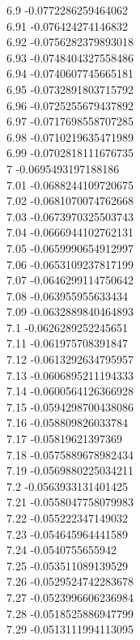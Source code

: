 {6.9	-0.0772286259464062\\
6.91	-0.076424274146832\\
6.92	-0.0756282379893018\\
6.93	-0.0748404327558486\\
6.94	-0.0740607745665181\\
6.95	-0.0732891803715792\\
6.96	-0.0725255679437892\\
6.97	-0.0717698558707285\\
6.98	-0.0710219635471989\\
6.99	-0.0702818111676735\\
7	-0.0695493197188186\\
7.01	-0.0688244109720675\\
7.02	-0.0681070074762668\\
7.03	-0.0673970325503743\\
7.04	-0.0666944102762131\\
7.05	-0.0659990654912997\\
7.06	-0.0653109237817199\\
7.07	-0.0646299114750642\\
7.08	-0.063955955633434\\
7.09	-0.0632889840464893\\
7.1	-0.0626289252245651\\
7.11	-0.061975708391847\\
7.12	-0.0613292634795957\\
7.13	-0.0606895211194333\\
7.14	-0.0600564126366928\\
7.15	-0.0594298700438086\\
7.16	-0.058809826033784\\
7.17	-0.05819621397369\\
7.18	-0.0575889678982434\\
7.19	-0.0569880225034211\\
7.2	-0.0563933131401425\\
7.21	-0.0558047758079983\\
7.22	-0.055222347149032\\
7.23	-0.054645964441589\\
7.24	-0.0540755655942\\
7.25	-0.053511089139529\\
7.26	-0.0529524742283678\\
7.27	-0.0523996606236984\\
7.28	-0.0518525886947799\\
7.29	-0.0513111994113095\\
}
